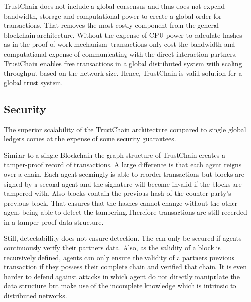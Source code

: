 TrustChain does not include a global consensus and thus does not expend bandwidth, storage and 
computational power to create a global order for transactions. That removes the most costly component
from the general blockchain architecture. Without the expense of CPU power to calculate hashes as in the proof-of-work mechanism,
transactions only cost the bandwidth and computational expense of communicating with 
the direct interaction partners. TrustChain enables free transactions in a global distributed 
system with scaling throughput based on the network size. Hence, TrustChain is valid solution for a
global trust system.

\subsection{Security}
The superior scalability of the TrustChain architecture compared to single global ledgers comes at 
the expense of some security guarantees.

Similar to a single Blockchain the graph structure of TrustChain creates a tamper-proof record of
transactions. A large difference is that each agent reigns over a chain. Each agent seemingly is 
able to reorder transactions but blocks are signed by a second agent and the signature will become
invalid if the blocks are tampered with. Also blocks contain the previous hash of the counter party's
previous block. That ensures that the hashes cannot change without the other agent being able to 
detect the tampering.Therefore transactions are still recorded in a tamper-proof data structure.

Still, detectabillity does not ensure detection. The can only be secured if agents
continuously verify their partners data. Also, as the validity of a block is recursively defined, 
agents can only ensure the validity of a partners previous transaction if they possess their complete
chain and verified that chain. It is even harder to defend against attacks in which agent do not 
directly manipulate the data structure but make use of the incomplete knowledge which is intrinsic 
to distributed networks. 


